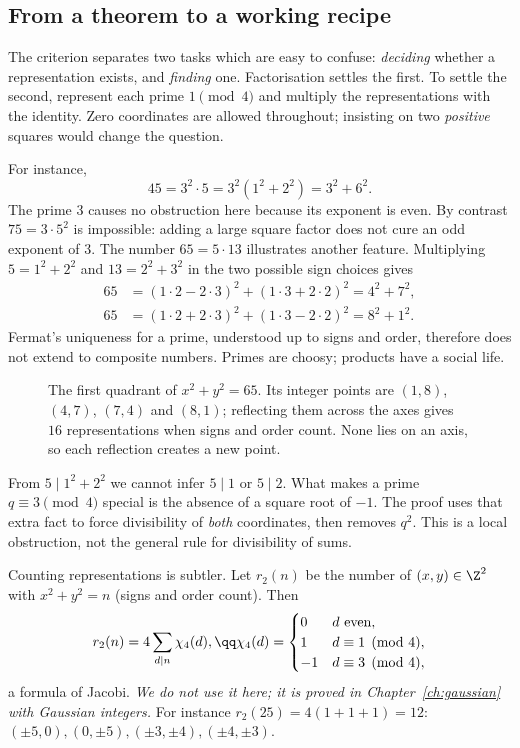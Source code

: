 \subsection*{From a theorem to a working recipe}
The criterion separates two tasks which are easy to confuse: \emph{deciding} whether a representation exists, and \emph{finding} one. Factorisation settles the first. To settle the second, represent each prime $1\pmod4$ and multiply the representations with the identity. Zero coordinates are allowed throughout; insisting on two \emph{positive} squares would change the question.

For instance,
\[
45=3^2\cdot5=3^2(1^2+2^2)=3^2+6^2.
\]
The prime $3$ causes no obstruction here because its exponent is even. By contrast $75=3\cdot5^2$ is impossible: adding a large square factor does not cure an odd exponent of $3$. The number $65=5\cdot13$ illustrates another feature. Multiplying $5=1^2+2^2$ and $13=2^2+3^2$ in the two possible sign choices gives
\[
\begin{aligned}
65&=(1\cdot2-2\cdot3)^2+(1\cdot3+2\cdot2)^2=4^2+7^2,\\
65&=(1\cdot2+2\cdot3)^2+(1\cdot3-2\cdot2)^2=8^2+1^2.
\end{aligned}
\]
Fermat's uniqueness for a prime, understood up to signs and order, therefore does not extend to composite numbers. Primes are choosy; products have a social life.

\begin{figure}[ht]
\centering
{}
\caption{The first quadrant of $x^2+y^2=65$. Its integer points are $(1,8)$, $(4,7)$, $(7,4)$ and $(8,1)$; reflecting them across the axes gives $16$ representations when signs and order count. None lies on an axis, so each reflection creates a new point.}
\label{fig:sixtyfive}
\end{figure}

\begin{reminder}
From $5\mid1^2+2^2$ we cannot infer $5\mid1$ or $5\mid2$. What makes a prime $q\equiv3\pmod4$ special is the absence of a square root of $-1$. The proof uses that extra fact to force divisibility of \emph{both} coordinates, then removes $q^2$. This is a local obstruction, not the general rule for divisibility of sums.
\end{reminder}

Counting representations is subtler. Let $r_2(n)$ be the number of $(x,y)\in\Z^2$ with $x^2+y^2=n$ (signs and order count). Then
\[
\begin{gathered}r_2(n)=4\sum_{d\mid n}\chi_4(d),\qq\chi_4(d)=\begin{cases}0&d\text{ even},\\1&d\equiv1\pmod4,\\-1&d\equiv3\pmod4,\end{cases}\end{gathered}
\]
a formula of Jacobi. \emph{We do not use it here; it is proved in Chapter~\ref{ch:gaussian} with Gaussian integers.} For instance $r_2(25)=4(1+1+1)=12$: $(\pm5,0),(0,\pm5),(\pm3,\pm4),(\pm4,\pm3)$.

